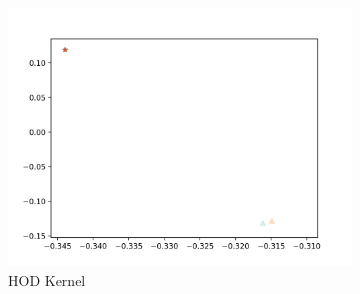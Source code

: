 \documentclass[10pt]{article}
\begin{document}
\begin{figure}[H]
\begin{subfigure}[h]{0.3\textwidth}
        \includegraphics[width=\linewidth]{ms_hod}
        \caption{HOD Kernel}
    \end{subfigure}%
    \begin{subfigure}[h]{0.08\textwidth}

\end{subfigure}
\end{figure}
\end{document}
